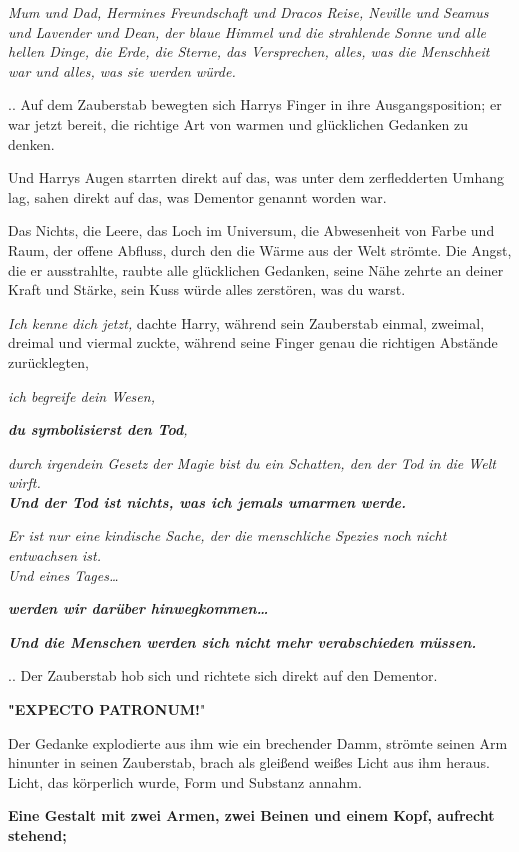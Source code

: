 {\emph{\hfill\break Mum und Dad, Hermines Freundschaft und Dracos Reise, Neville und Seamus und Lavender und Dean, der blaue Himmel und die strahlende Sonne und alle hellen Dinge, die Erde, die Sterne, das Versprechen, alles, was die Menschheit war und alles, was sie werden würde.}

.. Auf dem Zauberstab bewegten sich Harrys Finger in ihre Ausgangsposition; er war jetzt bereit, die richtige Art von warmen und glücklichen Gedanken zu denken.

Und Harrys Augen starrten direkt auf das, was unter dem zerfledderten Umhang lag, sahen direkt auf das, was Dementor genannt worden war.

Das Nichts, die Leere, das Loch im Universum, die Abwesenheit von Farbe und Raum, der offene Abfluss, durch den die Wärme aus der Welt strömte. Die Angst, die er ausstrahlte, raubte alle glücklichen Gedanken, seine Nähe zehrte an deiner Kraft und Stärke, sein Kuss würde alles zerstören, was du warst.

\emph{Ich kenne dich jetzt,} dachte Harry, während sein Zauberstab einmal, zweimal, dreimal und viermal zuckte, während seine Finger genau die richtigen Abstände zurücklegten,

\emph{ich begreife dein Wesen,}

\textbf{\emph{du symbolisierst den Tod}}\emph{,}

\emph{durch irgendein Gesetz der Magie bist du ein Schatten, den der Tod in die Welt wirft.}\\ \textbf{\emph{Und der Tod ist nichts, was ich jemals umarmen werde.}}

\emph{Er ist nur eine kindische Sache, der die menschliche Spezies noch nicht entwachsen ist.\\ Und eines Tages…}

\textbf{\emph{werden wir darüber hinwegkommen…}}

\textbf{\emph{Und die Menschen werden sich nicht mehr verabschieden müssen.}}

.. Der Zauberstab hob sich und richtete sich direkt auf den Dementor.

\textbf{"EXPECTO PATRONUM!}"

Der Gedanke explodierte aus ihm wie ein brechender Damm, strömte seinen Arm hinunter in seinen Zauberstab, brach als gleißend weißes Licht aus ihm heraus. Licht, das körperlich wurde, Form und Substanz annahm.

\textbf{Eine Gestalt mit zwei Armen, zwei Beinen und einem Kopf, aufrecht stehend;}

}
